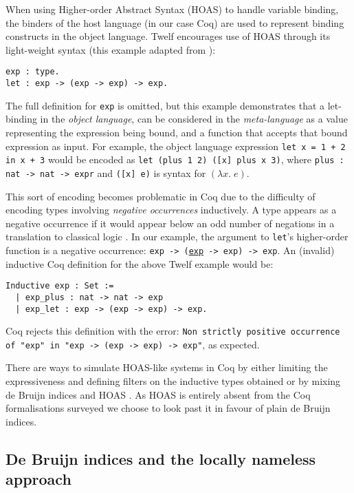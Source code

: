 \documentclass[]{unswthesis}
\let\c\texttt
\begin{document}
When using Higher-order Abstract Syntax (HOAS) to handle variable binding, the binders of the host language (in our case Coq) are used to represent binding constructs in the object language. Twelf encourages use of HOAS through its light-weight syntax (this example adapted from \cite{twelf08}):

\begin{verbatim}
exp : type.
let : exp -> (exp -> exp) -> exp.
\end{verbatim}

The full definition for \c{exp} is omitted, but this example demonstrates that a let-binding in the \textit{object language}, can be considered in the \textit{meta-language} as a value representing the expression being bound, and a function that accepts that bound expression as input. For example, the object language expression \c{let x = 1 + 2 in x + 3} would be encoded as \c{let (plus 1 2) ([x] plus x 3)}, where \c{plus : nat -> nat -> expr} and \c{([x] e)} is syntax for $(\lambda x. \; e)$.

This sort of encoding becomes problematic in Coq due to the difficulty of encoding types involving \textit{negative occurrences} inductively. A type appears as a negative occurrence if it would appear below an odd number of negations in a translation to classical logic \cite{tapl}. In our example, the argument to \c{let}'s higher-order function is a negative occurrence: \c{exp -> (\underline{exp} -> exp) -> exp}. An (invalid) inductive Coq definition for the above Twelf example would be:

\begin{verbatim}
Inductive exp : Set :=
  | exp_plus : nat -> nat -> exp
  | exp_let : exp -> (exp -> exp) -> exp.
\end{verbatim}

Coq rejects this definition with the error: \c{Non strictly positive occurrence of "exp" in
 "exp -> (exp -> exp) -> exp"}, as expected.
 
There are ways to simulate HOAS-like systems in Coq by either limiting the expressiveness and defining filters on the inductive types obtained \cite{despeyroux95} or by mixing de Bruijn indices and HOAS \cite{capretta07}. As HOAS is entirely absent from the Coq formalisations surveyed we choose to look past it in favour of plain de Bruijn indices.

\subsection{De Bruijn indices and the locally nameless approach}
\label{sec:de_bruijn}
\end{document}
